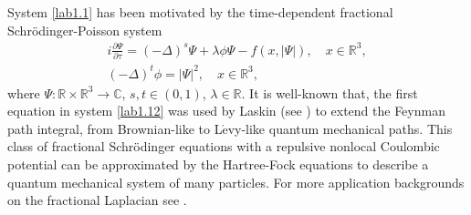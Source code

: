 \documentclass[10pt,a4paper]{amsart}
\numberwithin{equation}{section}
\begin{document}
System \eqref{lab1.1} has been motivated by the
time-dependent fractional Schr\"odinger-Poisson system
\begin{equation}\label{lab1.12}
\begin{gathered}
i\frac{\partial \Psi}{\partial \tau } =(-\Delta)^s\Psi +\lambda\phi\Psi-f(x,|\Psi|),
\quad  x\in \mathbb{R}^3,\\
(-\Delta)^t\phi=|\Psi|^2, \quad  x\in \mathbb{R}^3,
\end{gathered}
\end{equation}
where $\Psi: {\mathbb{R}\times \mathbb{R}^3}\to \mathbb{C}$, $s,t \in(0,1)$,
$\lambda \in \mathbb{R}$. It is well-known that, the first equation in
system \eqref{lab1.12} was used by Laskin (see \cite{L2998, L3998}) to extend the Feynman path integral, from Brownian-like to L$\mathrm {\acute{e}}$vy-like quantum mechanical paths. This class of fractional Schr\"odinger equations with a repulsive nonlocal Coulombic potential can be approximated by the Hartree-Fock equations to describe a quantum mechanical system of many particles. For more application backgrounds on the fractional Laplacian see \cite{C4998, D7998, M6998}.
\end{document}
